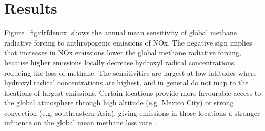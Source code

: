 \section{Results}

Figure~\ref{fig:drfdenox} shows the annual mean sensitivity of global methane radiative forcing to anthropogenic emissions of NOx. The negative sign implies that increases in NOx emissions lower the global methane radiative forcing, because higher emissions locally decrease hydroxyl radical concentrations, reducing the loss of methane. The sensitivities are largest at low latitudes where hydroxyl radical concentrations are highest, and in general do not map to the locations of largest emissions. Certain locations provide more favourable access to the global atmosphere through high altitude (e.g. Mexico City) or strong convection (e.g. southeastern Asia), giving emissions in those locations a stronger influence on the global mean methane loss rate~\citep{ref:bowman2012}.